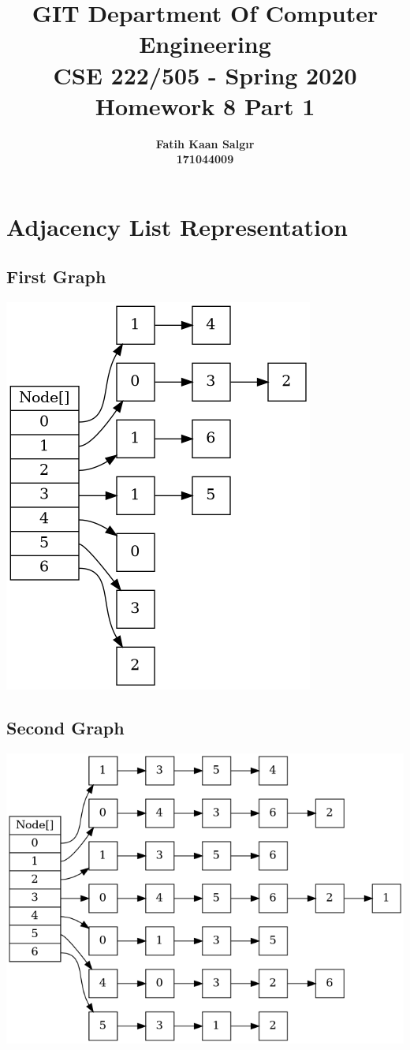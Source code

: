 \documentclass[a4paper,12pt]{extarticle}
\title{\textbf{GIT Department Of Computer Engineering\\ 
CSE 222/505 - Spring 2020\\
Homework 8 Part 1 \vspace{1in}}}
\author{\textbf{Fatih Kaan Salgır} \\ 
\textbf{171044009}}
\date{}
\begin{document}
  \maketitle

  \newpage
  
  \section{Adjacency List Representation}
  \subsection{First Graph}

	\includegraphics[scale=.4]{adjacency-list/1}

  \subsection{Second Graph}

	\includegraphics[scale=.4]{adjacency-list/2}
\end{document}
